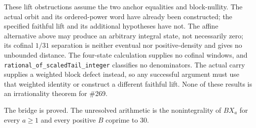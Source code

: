 These lift obstructions assume the two anchor equalities and block-nullity.
The actual orbit and its ordered-power word have already been constructed;
the specified faithful lift and its additional hypotheses have not.  The affine alternative above may produce an
arbitrary integral state, not necessarily zero; its cofinal $1/31$ separation
is neither eventual nor positive-density and gives no unbounded distance.
The four-state calculation supplies no cofinal windows, and
\texttt{rational\_of\_scaledTail\_integer} classifies no denominators.  The
actual carry supplies a weighted block defect instead, so any successful
argument must use that weighted identity or construct a different faithful
lift.  None of these results is an irrationality theorem for \#269.

The bridge is proved.  The unresolved arithmetic is the nonintegrality
of $BX_a$ for every $a\ge1$ and every positive $B$ coprime to $30$.
